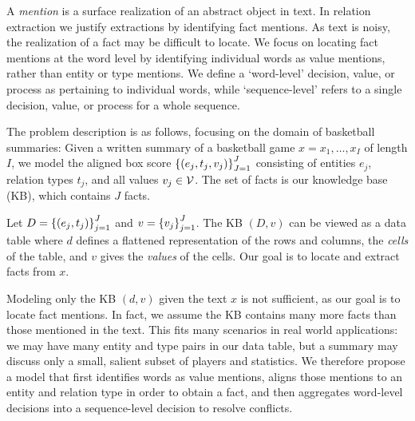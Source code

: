 \documentclass[12pt]{article}
\begin{document}
A \textit{mention} is a surface realization of an abstract object in text.
In relation extraction we justify extractions by identifying fact mentions.
As text is noisy, the realization of a fact may be difficult to locate.
We focus on locating fact mentions at the word level by identifying
individual words as value mentions, rather than entity or type mentions.
We define a `word-level' decision, value, or process as pertaining to individual words,
while `sequence-level' refers to a single decision, value, or process for a whole sequence.

\begin{comment}
Note on related work:
Except for \citet{zeng2018copy}, prior work has either assumed that the locations of
entities and values are given as input features or that the locations of entities and values
are observed at training time.
\end{comment}

The problem description is as follows, focusing on the domain of basketball summaries:
Given a written summary of a basketball game $x = x_1, \ldots, x_{I}$
of length $I$,
we model the aligned box score $\left\{(e_j, t_j, v_j)\right\}_{J=1}^J$
consisting of entities $e_j$,
relation types $t_j$, and all values $v_j \in \mathcal{V}$.
The set of facts is our knowledge base (KB), which contains $J$ facts.

Let $D = \left\{(e_j, t_j)\right\}_{j=1}^J$ and $v = \left\{v_j\right\}_{j=1}^J$.
The KB $(D,v)$ can be viewed as a data table where
$d$ defines a flattened representation of the rows and columns,
the \textit{cells} of the table, and
$v$ gives the \textit{values} of the cells.
Our goal is to locate and extract facts from $x$.


Modeling only the KB $(d,v)$ given the text $x$
is not sufficient, as our goal is to locate fact mentions.
In fact, we assume the KB contains many more facts than those mentioned in the text.
This fits many scenarios in real world applications:
we may have many entity and type pairs in our data table,
but a summary may discuss only a small, salient subset of players and statistics.
We therefore propose a model that first identifies words as value mentions,
aligns those mentions to an entity and relation type in order to obtain a fact, 
and then aggregates word-level decisions into a sequence-level decision to resolve conflicts.
\end{document}
